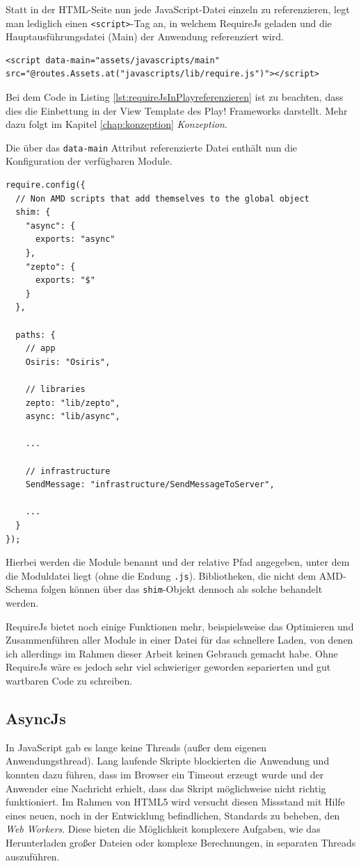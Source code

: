 Statt in der HTML-Seite nun jede JavaScript-Datei einzeln zu referenzieren, legt man lediglich einen \texttt{<script>}-Tag an, in welchem RequireJs geladen und die Hauptausführungsdatei (Main) der Anwendung referenziert wird.
\lstset{language=HTML}
\begin{lstlisting}[caption={Referenzierung einer RequireJs-Anwendung in einer Play! Framework Template}, label={lst:requireJsInPlayreferenzieren}]
<script data-main="assets/javascripts/main" src="@routes.Assets.at("javascripts/lib/require.js")"></script>
\end{lstlisting}
Bei dem Code in Listing \ref{lst:requireJsInPlayreferenzieren} ist zu beachten, dass dies die Einbettung in der View Template des Play! Frameworks darstellt. Mehr dazu folgt im Kapitel \ref{chap:konzeption} \textit{Konzeption}.

Die über das \texttt{data-main} Attribut referenzierte Datei enthält nun die Konfiguration der verfügbaren Module.
\lstset{language=JavaScript}
\begin{lstlisting}[caption={Konfiguration der verfügbaren Module}, label={lst:konfigurationModule}]
require.config({
  // Non AMD scripts that add themselves to the global object
  shim: {
    "async": {
      exports: "async"
    },
    "zepto": {
      exports: "$"
    }
  },

  paths: {
    // app
    Osiris: "Osiris",

    // libraries
    zepto: "lib/zepto",
    async: "lib/async",

    ...

    // infrastructure
    SendMessage: "infrastructure/SendMessageToServer",

    ...
  }
});
\end{lstlisting}
Hierbei werden die Module benannt und der relative Pfad angegeben, unter dem die Moduldatei liegt (ohne die Endung \texttt{.js}). Bibliotheken, die nicht dem AMD-Schema folgen können über das \texttt{shim}-Objekt dennoch als solche behandelt werden.

RequireJs bietet noch einige Funktionen mehr, beispielsweise das Optimieren und Zusammenführen aller Module in einer Datei für das schnellere Laden, von denen ich allerdings im Rahmen dieser Arbeit keinen Gebrauch gemacht habe. Ohne RequireJs wäre es jedoch sehr viel schwieriger geworden separierten und gut wartbaren Code zu schreiben.

\subsection{AsyncJs}
In JavaScript gab es lange keine Threads (außer dem eigenen Anwendungsthread). Lang laufende Skripte blockierten die Anwendung und konnten dazu führen, dass im Browser ein Timeout erzeugt wurde und der Anwender eine Nachricht erhielt, dass das Skript möglichweise nicht richtig funktioniert. Im Rahmen von HTML5 wird versucht diesen Missstand mit Hilfe eines neuen, noch in der Entwicklung befindlichen, Standards zu beheben, den \textit{Web Workers}. Diese bieten die Möglichkeit komplexere Aufgaben, wie das Herunterladen großer Dateien oder komplexe Berechnungen, in separaten Threads auszuführen.

